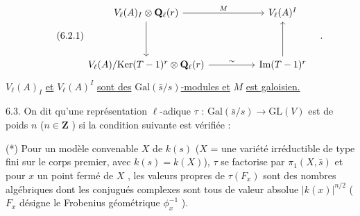 \begin{equation}\tag{6.2.1}
\begin{tikzcd}[column sep=huge, row sep=huge]
V_{\ell}(A)_{I} \otimes \mathbf{Q}_{\ell}(r) \arrow[r, "M"] \arrow[d] & V_{\ell}(A)^{I} \\
V_{\ell}(A)/\mathrm{Ker}(T-1)^{r} \otimes \mathbf{Q}_{\ell}(r) \arrow[r, "\sim"] & \mathrm{Im}(T-1)^{r} \arrow[u]
\end{tikzcd}\quad .
\end{equation}
$V_{\ell}(A)_{I}$ \underline{et} $V_{\ell}(A)^{I}$ \underline{sont des} $\mathrm{Gal}(\bar{s}/s)$\underline{-modules et} $M$ \underline{est galoisien.}

6.3. On dit qu'une représentation $\ell$-adique $\tau$ : $\mathrm{Gal}(\bar{s}/s) \longrightarrow \mathrm{GL}(V)$ est de poids $n$ ($n \in \mathbf{Z}$ ) si la condition suivante est vérifiée :

(*) Pour un modèle convenable $X$ de $k(s)$ ($X$ = une variété irréductible de type fini sur le corps premier, avec $k(s) = k(X)$), $\tau$ se factorise par $\pi_{1}(X,\bar{s})$ et pour $x$ un point fermé de $X$ , les valeurs propres de $\tau(F_{x})$ sont des nombres algébriques dont les conjugués complexes sont tous de valeur absolue $|k(x)|^{n/2}$ ($F_{x}$ désigne le Frobenius géométrique $\phi_{x}^{-1}$ ).


